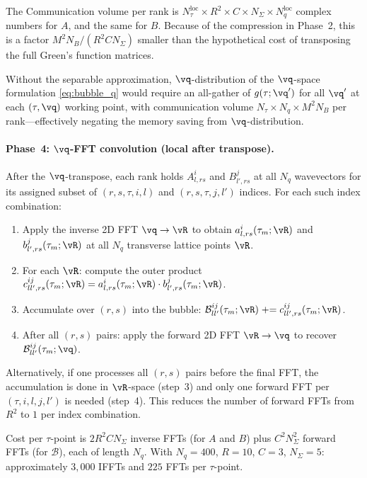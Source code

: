 The Communication volume per rank is
$N_\tau^{\mathrm{loc}} \times R^2 \times C \times N_\Sigma
  \times N_q^{\mathrm{loc}}$ complex numbers for $A$, and the
same for $B$.  Because of the compression in Phase~2, this is
a factor $M^2 N_B / (R^2 C N_\Sigma)$ smaller than the
hypothetical cost of transposing the full Green's function
matrices.

Without the separable approximation, $\vq$-distribution of the
$\vq$-space formulation \cref{eq:bubble_q} would require an
all-gather of $g(\tau;\vq')$ for all $\vq'$ at each $(\tau,\vq)$
working point, with communication volume
$N_\tau \times N_q \times M^2 N_B$ per rank---effectively
negating the memory saving from $\vq$-distribution.

\paragraph{Phase~4: $\vq$-FFT convolution
  (local after transpose).}
%
After the $\vq$-transpose, each rank holds $A^i_{l,rs}$ and
$B^j_{l',rs}$ at all $N_q$ wavevectors for its assigned subset
of $(r,s,\tau,i,l)$ and $(r,s,\tau,j,l')$ indices.  For each
such index combination:

\begin{enumerate}
\item Apply the inverse 2D FFT $\vq\to\vR$ to obtain
  $a^i_{l,rs}(\tau_m;\vR)$ and $b^j_{l',rs}(\tau_m;\vR)$ at all
  $N_q$ transverse lattice points $\vR$.
\item For each $\vR$: compute the outer product
  $c^{ij}_{ll',rs}(\tau_m;\vR) =
    a^i_{l,rs}(\tau_m;\vR) \cdot b^j_{l',rs}(\tau_m;\vR)$.
\item Accumulate over $(r,s)$ into the bubble:
  $\mathcal{B}^{ij}_{ll'}(\tau_m;\vR)
    \mathrel{+}= c^{ij}_{ll',rs}(\tau_m;\vR)$.
\item After all $(r,s)$ pairs: apply the forward 2D FFT
  $\vR\to\vq$ to recover
  $\mathcal{B}^{ij}_{ll'}(\tau_m;\vq)$.
\end{enumerate}

Alternatively, if one processes all $(r,s)$ pairs before the
final FFT, the accumulation is done in $\vR$-space (step~3)
and only one forward FFT per $(\tau,i,l,j,l')$ is needed
(step~4).  This reduces the number of forward FFTs from
$R^2$ to $1$ per index combination.

Cost per $\tau$-point is
$2 R^2 C N_\Sigma$ inverse FFTs (for $A$ and $B$) plus
$C^2 N_\Sigma^2$ forward FFTs (for $\mathcal{B}$), each of
length $N_q$.  With $N_q = 400$, $R = 10$, $C = 3$,
$N_\Sigma = 5$: approximately $3{,}000$ IFFTs and $225$ FFTs
per $\tau$-point.

